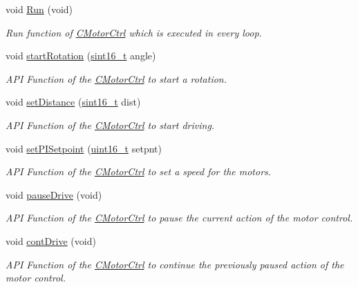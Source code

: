 \begin{DoxyCompactItemize}
void \mbox{\hyperlink{class_c_motor_ctrl_a63e5dd36be027fe8a5e1acee5c1322c8}{Run}} (void)
\begin{DoxyCompactList}\small\item\em Run function of \mbox{\hyperlink{class_c_motor_ctrl}{C\+Motor\+Ctrl}} which is executed in every loop. \end{DoxyCompactList}\item 
void \mbox{\hyperlink{class_c_motor_ctrl_a1ee991f9511437a2e64ee75161063020}{start\+Rotation}} (\mbox{\hyperlink{_a_d_a_s___types_8h_ae4c9b951dbb7355563c313abca5e2e75}{sint16\+\_\+t}} angle)
\begin{DoxyCompactList}\small\item\em A\+PI Function of the \mbox{\hyperlink{class_c_motor_ctrl}{C\+Motor\+Ctrl}} to start a rotation. \end{DoxyCompactList}\item 
void \mbox{\hyperlink{class_c_motor_ctrl_a0ae095bb6003ee63086361661f32ad3a}{set\+Distance}} (\mbox{\hyperlink{_a_d_a_s___types_8h_ae4c9b951dbb7355563c313abca5e2e75}{sint16\+\_\+t}} dist)
\begin{DoxyCompactList}\small\item\em A\+PI Function of the \mbox{\hyperlink{class_c_motor_ctrl}{C\+Motor\+Ctrl}} to start driving. \end{DoxyCompactList}\item 
void \mbox{\hyperlink{class_c_motor_ctrl_a5c6d49d9b407e46aad0abe84bcaf16ec}{set\+P\+I\+Setpoint}} (\mbox{\hyperlink{_a_d_a_s___types_8h_a1f1825b69244eb3ad2c7165ddc99c956}{uint16\+\_\+t}} setpnt)
\begin{DoxyCompactList}\small\item\em A\+PI Function of the \mbox{\hyperlink{class_c_motor_ctrl}{C\+Motor\+Ctrl}} to set a speed for the motors. \end{DoxyCompactList}\item 
void \mbox{\hyperlink{class_c_motor_ctrl_af3e047be659fb9f49f1644ba2eca4684}{pause\+Drive}} (void)
\begin{DoxyCompactList}\small\item\em A\+PI Function of the \mbox{\hyperlink{class_c_motor_ctrl}{C\+Motor\+Ctrl}} to pause the current action of the motor control. \end{DoxyCompactList}\item 
void \mbox{\hyperlink{class_c_motor_ctrl_a6b67180c355c2acf76d641f2817db66d}{cont\+Drive}} (void)
\begin{DoxyCompactList}\small\item\em A\+PI Function of the \mbox{\hyperlink{class_c_motor_ctrl}{C\+Motor\+Ctrl}} to continue the previously paused action of the motor control. \end{DoxyCompactList}\end{DoxyCompactItemize}


